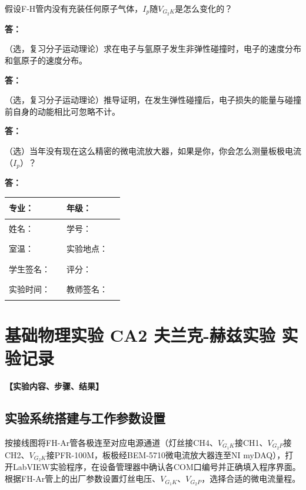 \documentclass[dvipsnames, svgnames,a4paper,11pt]{article}
\newcommand{\answerblank}[1][3.8cm]{%
  \par\nopagebreak[4]\noindent\textbf{答：}\par\nopagebreak[4]\vspace*{#1}}
\begin{document}
\begin{question}
	假设F-H管内没有充装任何原子气体，$I_p$随$V_{G_2K}$是怎么变化的？
\end{question}
\answerblank[3.8cm]

\begin{question}
	（选，复习分子运动理论）求在电子与氩原子发生非弹性碰撞时，电子的速度分布和氩原子的速度分布。
\end{question}
\answerblank[3.8cm]

\begin{question}
	（选，复习分子运动理论）推导证明，在发生弹性碰撞后，电子损失的能量与碰撞前自身的动能相比可忽略不计。
\end{question}
\answerblank[3.8cm]

\begin{question}
	（选）当年没有现在这么精密的微电流放大器，如果是你，你会怎么测量板极电流（$I_p$）？
\end{question}
\answerblank[3.8cm]

\clearpage
\begin{table}
	\renewcommand\arraystretch{1.7}
	\centering
	\begin{tabularx}{\textwidth}{|X|X|X|X|}
	\hline
	专业：& \rule{2.5cm}{0.4pt} &年级：& \rule{2.5cm}{0.4pt} \\
	\hline
	姓名： & \rule{2.5cm}{0.4pt}  & 学号：& \rule{3cm}{0.4pt} \\
	\hline
	室温：& \rule{2.5cm}{0.4pt} & 实验地点： & \rule{2.5cm}{0.4pt} \\
	\hline
	学生签名：& \rule{2.5cm}{0.4pt}& 评分： &\\
	\hline
	实验时间：& \rule{3cm}{0.4pt} & 教师签名：& \rule{3cm}{0.4pt} \\
	\hline
	\end{tabularx}
\end{table}

\section{基础物理实验  \quad CA2 夫兰克-赫兹实验 \heiti 实验记录}


\textbf{【实验内容、步骤、结果】}

\subsection{实验系统搭建与工作参数设置}

按接线图将FH-Ar管各极连至对应电源通道（灯丝接CH4、$V_{G_1K}$接CH1、$V_{G_2P}$接CH2、$V_{G_2K}$接PFR-100M，板极经BEM-5710微电流放大器连至NI myDAQ），打开LabVIEW实验程序，在设备管理器中确认各COM口编号并正确填入程序界面。根据FH-Ar管上的出厂参数设置灯丝电压、$V_{G_1K}$、$V_{G_2P}$，选择合适的微电流量程。
\end{document}
